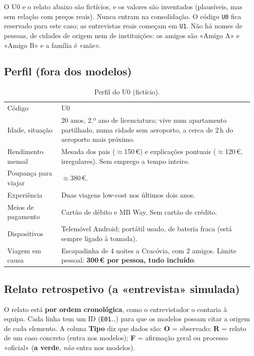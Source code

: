 \documentclass[11pt,a4paper]{article}
\begin{document}
\begin{aviso}
O U0 e o relato abaixo são fictícios, e os valores são inventados (plausíveis, mas sem relação com preços reais). Nunca entram na consolidação. O código \texttt{U0} fica reservado para este caso; as entrevistas reais começam em \texttt{U1}. Não há nomes de pessoas, de cidades de origem nem de instituições: os amigos são «Amigo A» e «Amigo B» e a família é «mãe».
\end{aviso}

\subsection{Perfil (fora dos modelos)}

\begin{table}[h]
\centering\small
\begin{tabularx}{\textwidth}{@{}p{4.2cm}L@{}}
\toprule
Código & U0 \\
Idade, situação & 20 anos, 2.º ano de licenciatura; vive num apartamento partilhado, numa cidade sem aeroporto, a cerca de 2\,h do aeroporto mais próximo. \\
Rendimento mensal & Mesada dos pais (\(\approx\)150\,€) e explicações pontuais (\(\approx\)120\,€, irregulares). Sem emprego a tempo inteiro. \\
Poupança para viajar & \(\approx\)380\,€. \\
Experiência & Duas viagens low-cost nos últimos dois anos. \\
Meios de pagamento & Cartão de débito e MB Way. Sem cartão de crédito. \\
Dispositivos & Telemóvel Android; portátil usado, de bateria fraca (está sempre ligado à tomada). \\
Viagem em causa & Escapadinha de 4 noites a Cracóvia, com 2 amigos. Limite pessoal: \textbf{300\,€ por pessoa, tudo incluído}. \\
\bottomrule
\end{tabularx}
\caption{Perfil do U0 (fictício).}
\end{table}

\subsection{Relato retrospetivo (a «entrevista» simulada)}

O relato está \textbf{por ordem cronológica}, como o entrevistador o contaria à equipa. Cada linha tem um ID (\texttt{E01}\ldots) para que os modelos possam citar a origem de cada elemento. A coluna \textbf{Tipo} diz que dados são:
\textbf{O} = observado; \textbf{R} = relato de um caso concreto (entra nos modelos); \textbf{F} = afirmação geral ou processo «oficial» (\textcolor{green!50!black}{\textbf{a verde}}, \emph{não} entra nos modelos).
\end{document}
